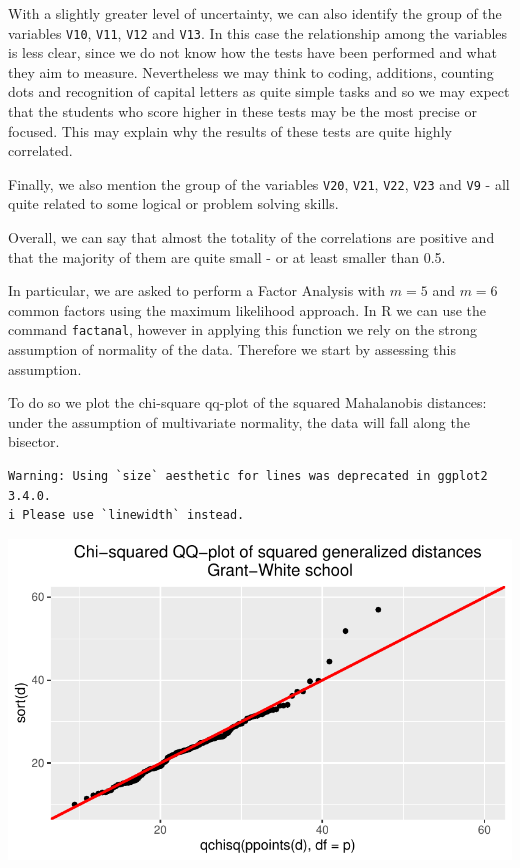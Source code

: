 \documentclass[
  letterpaper,
  DIV=11,
  numbers=noendperiod]{scrartcl}
\begin{document}
With a slightly greater level of uncertainty, we can also identify the
group of the variables \texttt{V10}, \texttt{V11}, \texttt{V12} and
\texttt{V13}. In this case the relationship among the variables is less
clear, since we do not know how the tests have been performed and what
they aim to measure. Nevertheless we may think to coding, additions,
counting dots and recognition of capital letters as quite simple tasks
and so we may expect that the students who score higher in these tests
may be the most precise or focused. This may explain why the results of
these tests are quite highly correlated.

Finally, we also mention the group of the variables \texttt{V20},
\texttt{V21}, \texttt{V22}, \texttt{V23} and \texttt{V9} - all quite
related to some logical or problem solving skills.

Overall, we can say that almost the totality of the correlations are
positive and that the majority of them are quite small - or at least
smaller than 0.5.

In particular, we are asked to perform a Factor Analysis with \(m=5\)
and \(m=6\) common factors using the maximum likelihood approach. In R
we can use the command \texttt{factanal}, however in applying this
function we rely on the strong assumption of normality of the data.
Therefore we start by assessing this assumption.

To do so we plot the chi-square qq-plot of the squared Mahalanobis
distances: under the assumption of multivariate normality, the data will
fall along the bisector.

\begin{verbatim}
Warning: Using `size` aesthetic for lines was deprecated in ggplot2 3.4.0.
i Please use `linewidth` instead.
\end{verbatim}

\includegraphics{ProblemSet2_files/figure-pdf/unnamed-chunk-9-1.pdf}
\end{document}
